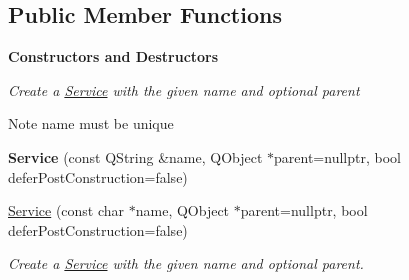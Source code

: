 \subsection*{Public Member Functions}
\begin{Indent}\textbf{ Constructors and Destructors}\par
{\em Create a \mbox{\hyperlink{classrev_1_1_service}{Service}} with the given name and optional parent

\begin{DoxyNote}{Note}
name must be unique 
\end{DoxyNote}
}\begin{DoxyCompactItemize}
\item 
\mbox{\label{classrev_1_1_service_a13bfd1240fbc59e9a1a28fe0447c3a69}} 
{\bfseries Service} (const Q\+String \&name, Q\+Object $\ast$parent=nullptr, bool defer\+Post\+Construction=false)
\item 
\mbox{\hyperlink{classrev_1_1_service_aeb56f97a50b0bb4b296adaa4c10d97f5}{Service}} (const char $\ast$name, Q\+Object $\ast$parent=nullptr, bool defer\+Post\+Construction=false)
\begin{DoxyCompactList}\small\item\em Create a \mbox{\hyperlink{classrev_1_1_service}{Service}} with the given name and optional parent. \end{DoxyCompactList}\end{DoxyCompactItemize}
\end{Indent}
